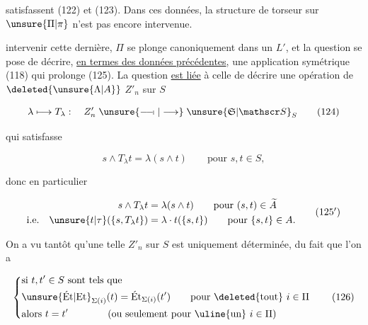 
satisfassent (122) et (123). Dans ces données, la structure de torseur sur $\unsure{\Pi|\pi}$ n'est pas encore intervenue.

  intervenir cette dernière, $\Pi$ se plonge canoniquement dans un $L'$, et la question se pose de décrire, \uline{en termes des données précédentes}, une application symétrique (118) qui prolonge (125). La question \uline{est liée} à celle de décrire une opération de $\deleted{\unsure{\Lambda|A}}$ $Z'_n$ sur $S$



\[
 \lambda\longmapsto T_\lambda:\quad Z'_n\mathrel{\unsure{\relbar\joinrel\relbar\mkern-2mu\shortmid|\longrightarrow}}\unsure{\mathfrak S|\mathscr S}_S
 \tag*{(124)}
\]

qui satisfasse

\[
 s\wedge T_\lambda t=\lambda(s\wedge t)\qquad\text{pour }s,t\in S,
 \tag*{(125)}
\]

donc  en particulier

\[
 \begin{aligned}
 s\wedge T_\lambda t&=\lambda(s\wedge t)\qquad\text{pour }(s,t)\in\widetilde A\\
 \text{i.e.}\quad \unsure{t|\tau}(\{s,T_\lambda t\})&=\lambda\cdot t(\{s,t\})\qquad\text{pour }\{s,t\}\in A.
 \end{aligned}
 \tag*{(125$'$)}
\]

On a vu tantôt qu'une telle      $Z'_n$ sur $S$ est uniquement déterminée, du fait que l'on a

\[
 \left\{\begin{aligned}
 &\text{si }t,t'\in S\text{ sont tels que}\\
 &\unsure{\text{Ét}|\text{Et}}_{\Sigma(i)}(t)=\text{Ét}_{\Sigma(i)}(t')\qquad
 \text{pour \deleted{tout} }i\in\Pi\\
 &\text{alors }t=t'\qquad\qquad\text{(ou seulement pour \uline{un} }i\in\Pi\text{)}
 \end{aligned}\right.
 \tag*{(126)}
\]

